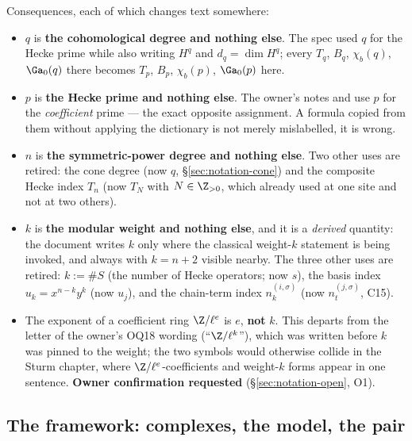 \noindent
Consequences, each of which changes text somewhere:
\begin{itemize}
\item $q$ is \textbf{the cohomological degree and nothing else}. The spec
   used $q$ for the Hecke prime while also writing $H^q$
  and $d_q=\dim H^q$; every $T_q$, $B_q$, $\chi_b(q)$, $\Ga_0(q)$ there becomes
  $T_p$, $B_p$, $\chi_b(p)$, $\Ga_0(p)$ here.
\item $p$ is \textbf{the Hecke prime and nothing else}. The owner's notes
   and
   use $p$ for the
  \emph{coefficient} prime --- the exact opposite assignment. A formula copied from
  them without applying the dictionary is not merely mislabelled, it is wrong.
\item $n$ is \textbf{the symmetric-power degree and nothing else}. Two other uses
  are retired: the cone degree (now $q$, \S\ref{sec:notation-cone}) and the composite
  Hecke index $T_n$ (now $T_N$ with $N\in\Z_{>0}$, which
   already used at one site and not at two others).
\item $k$ is \textbf{the modular weight and nothing else}, and it is a
  \emph{derived} quantity: the document writes $k$ only where the classical
  weight-$k$ statement is being invoked, and always with $k=n+2$ visible nearby. The
  three other uses are retired: $k:=\#S$ (the number of Hecke operators; now $s$),
  the basis index $u_k=x^{n-k}y^k$ (now $u_j$), and the chain-term index
  $n^{(i,\sigma)}_k$ (now $n^{(j,\sigma)}_t$, C15).
\item The exponent of a coefficient ring $\Z/\ell^{e}$ is $e$, \textbf{not} $k$.
  This departs from the letter of the owner's OQ18 wording (``$\Z/\ell^k$''), which
  was written before $k$ was pinned to the weight; the two symbols would otherwise
  collide in the Sturm chapter, where $\Z/\ell^{e}$-coefficients and weight-$k$ forms
  appear in one sentence. \textbf{Owner confirmation requested} (\S\ref{sec:notation-open}, O1).
\end{itemize}

\subsection{The framework: complexes, the model, the pair}\label{sec:notation-framework}

